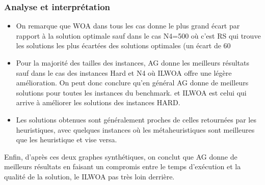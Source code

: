 \documentclass[12pt]{article}
\begin{document}
        \subsubsection{Analyse et interprétation}
            \begin{itemize}
                \item On remarque que WOA dans tous les cas donne le plus grand écart par rapport à la solution optimale sauf dans le cas N4=500 où c’est RS qui trouve les solutions les plus écartées des solutions optimales (un écart de 60%
                \item Pour la majorité des tailles des instances, AG donne les meilleurs résultats sauf dans le cas des instances Hard et N4 où ILWOA offre une légère amélioration. On peut donc conclure qu'en général AG donne de meilleurs solutions pour toutes les instances du benchmark. et ILWOA est celui qui arrive à améliorer les solutions des instances HARD. 
                \item Les solutions obtenues sont généralement proches de celles retournées par les heuristiques, avec quelques instances où les métaheuristiques sont meilleures que les heuristique et vise versa.
            \end{itemize}
            Enfin, d’après ces deux graphes synthétiques, on conclut  que AG donne de meilleurs résultats en faisant un compromis entre le temps d'exécution et la qualité de la solution, le ILWOA pas très loin derrière.
\end{document}
